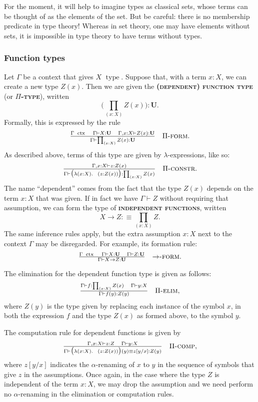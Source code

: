 \documentclass{article}
\newcommand{\defn}[1]{{\scshape\bfseries\color{MPBemph}#1}}
\newcommand{\infrule}[3]{\genfrac{}{}{}{}{#1}{#2}\hspace{1em}{\textsc{#3}}}
\DeclareMathOperator{\ctx}{~ctx}
\DeclareMathOperator{\type}{~type}
\newcommand{\gives}{\vdash}
\newcommand{\eql}{\mathbin{:\equiv}}
\newcommand{\U}{\mathbf{U}}
\newcommand{\tpi}[1]{\prod_{(#1)}}
\newcommand{\1}{\textbf{1}}
\newcommand{\0}{\mathbf{0}}
\newcommand{\2}{\textbf{2}}
\begin{document}
For the moment, it will help to imagine types as classical sets, whose terms can be thought of as the elements of the set. But be careful: there is no membership predicate in type theory! Whereas in set theory, one may have elements without sets, it is impossible in type theory to have terms without types.
\subsubsection{Function types}
Let \( \Gamma \) be a context that gives \( X \type \). Suppose that, with a term \( x : X \), we can create a new type \( Z(x) \). Then we are given the \defn{(dependent) function type} (or \defn{\( \Pi \)-type}), written
\[ \big( \tpi{x : X} Z(x) \big) : \U. \]
Formally, this is expressed by the rule
\[ \OD \infrule{\Gamma \ctx \hspace{1em} \Gamma \gives X : \U \hspace{1em} \Gamma, x : X \gives Z(x) : \U}{\Gamma \gives \tpi{x : X} Z(x) : \U}{\( \Pi \)-form}. \]
As described above, terms of this type are given by \( \lambda \)-expressions, like so:
\[ \OD \infrule{\Gamma, x : X \gives z : Z(x)}{\Gamma \gives \big( \lambda(x : X).~~ (z : Z(x)) \big) : \tpi{x : X} Z(x)}{\( \Pi \)-constr}. \]
The name ``dependent'' comes from the fact that the type \( Z(x) \) depends on the term \( x : X \) that was given. If in fact we have \( \Gamma \gives Z \) without requiring that assumption, we can form the type of \defn{independent functions}, written
\[ X \to Z \eql \tpi{x : X} Z. \]
The same inference rules apply, but the extra assumption \( x : X \) next to the context \( \Gamma \) may be disregarded. For example, its formation rule:
\[ \OD \infrule{\Gamma \ctx \hspace{1em} \Gamma \gives X : \U \hspace{1em} \Gamma \gives Z : \U}{\Gamma \gives X \to Z : \U}{\( \to \)-form}. \]

The elimination for the dependent function type is given as follows:
\[ \OD \infrule{\Gamma \gives f : \tpi{x : X} Z(x) \hspace{1em} \Gamma \gives y : X}{\Gamma \gives f(y) : Z(y)}{\( \Pi \)-elim}, \]
where \( Z(y) \) is the type given by replacing each instance of the symbol \( x \), in both the expression \( f \) and the type \( Z(x) \) as formed above, to the symbol \( y \).

The computation rule for dependent functions is given by
\[ \OD \infrule{\Gamma, x : X \gives z : Z \hspace{1em} \Gamma \gives y : X}{\Gamma \gives \big( \lambda(x : X).~~(z : Z(x)) \big)(y) \equiv z[y/x] : Z(y)}{\( \Pi \)-comp}, \]
where \( z[y/x] \) indicates the \( \alpha \)-renaming of \( x \) to \( y \) in the sequence of symbols that give \( z \) in the assumptions. Once again, in the case where the type \( Z \) is independent of the term \( x : X \), we may drop the assumption and we need perform no \( \alpha \)-renaming in the elimination or computation rules.
\end{document}

